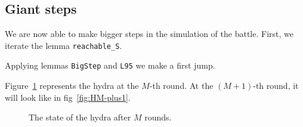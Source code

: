 



\subsection{Giant steps}

We are now able to make bigger steps in the simulation of the battle.
First, we iterate the lemma \texttt{reachable\_S}.


\vspace{4pt}



\vspace{4pt}

Applying lemmas \texttt{BigStep} and \texttt{L95} we make a first jump.

\vspace{4pt}





Figure~\ref{fig:HM}  represents the hydra at the $M$-th round.
At the $(M+1)$-th round, it will look like in fig~\ref{fig:HM-plus1}.





\begin{figure}[htb]
\centering
{}
\caption{\label{fig:HM}}
The state of the hydra after $M$ rounds.

\end{figure}


